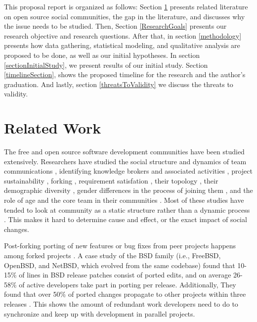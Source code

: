 \documentclass{report}
\begin{document}
This proposal report is organized as follows: Section \ref{relatedwork} presents related literature on open source social communities, the gap in the literature, and discusses why the issue needs to be studied. 
Then, Section \ref{ResearchGoals} presents our research objective and research questions. After that, in section \ref{methodology} presents how data gathering, statistical modeling, and qualitative analysis are proposed to be done, as well as our initial hypotheses. In section \ref{sectionInitialStudy}, we present results of our initial study. Section \ref{timelineSection}, shows the proposed timeline for the research and the author's graduation. And lastly, section \ref{threatsToValidity} we discuss the threats to validity.\\

\section{Related Work}
\label{relatedwork}

The free and open source software development communities have been studied extensively. Researchers have studied the social structure and dynamics of team communications \cite{Bird}\cite{Guzzi}\cite{HowisonSocialDynamics}\cite{HowisonFlossMole}\cite{Nakakoji}, identifying knowledge brokers and associated activities \cite{Sowe}, project sustainability \cite{Nakakoji}\cite{NymanForkingSustainability}, forking \cite{NymanCodeForking}, requirement satisfation \cite{Ernst}, their topology \cite{Bird}, their demographic diversity \cite{Kunegis}, gender differences in the process of joining them \cite{Kuechler}, and the role of age and the core team in their communities \cite{AzarbakhtOSS2014}\cite{AzarbakhtINSNA2014}\cite{DavidsonVLHCC2014}\cite{Torres}. Most of these studies have tended to look at community as a static structure rather than a dynamic process \cite{CrowstonFLOSSWhatWeKnow}. This makes it hard to determine cause and effect, or the exact impact of social changes.

Post-forking porting of new features or bug fixes from peer projects happens among forked projects \cite{Baishakhi}. A case study of the BSD family (i.e., FreeBSD, OpenBSD, and NetBSD, which evolved from the same codebase) found that 10-15\% of lines in BSD release patches consist of ported edits, and on average 26-58\% of active developers take part in porting per release. Additionally, They found that over 50\% of ported changes propagate to other projects within three releases \cite{Baishakhi}. This shows the amount of redundant work developers need to do to synchronize and keep up with development in parallel projects. 
\end{document}
